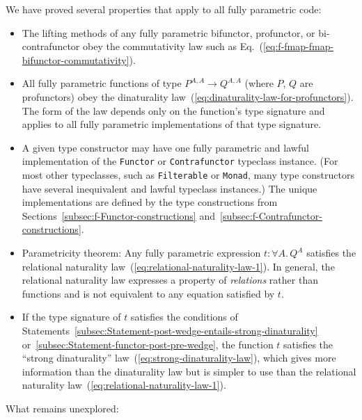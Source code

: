We have proved several properties that apply to all fully parametric
code:
\begin{itemize}
\item The lifting methods of any fully parametric bifunctor, profunctor,
or bi-contrafunctor obey the commutativity law such as Eq.~(\ref{eq:f-fmap-fmap-bifunctor-commutativity}). 
\item All fully parametric functions of type $P^{A,A}\rightarrow Q^{A,A}$
(where $P$, $Q$ are profunctors) obey the dinaturality law~(\ref{eq:dinaturality-law-for-profunctors}).
The form of the law depends only on the function\textsf{'}s type signature
and applies to all fully parametric implementations of that type signature. 
\item A given type constructor may have one fully parametric and lawful
implementation of the \lstinline!Functor! or \lstinline!Contrafunctor!
typeclass instance. (For most other typeclasses, such as \lstinline!Filterable!
or \lstinline!Monad!, many type constructors have several inequivalent
and lawful typeclass instances.) The unique implementations are defined
by the type constructions from Sections~\ref{subsec:f-Functor-constructions}
and~\ref{subsec:f-Contrafunctor-constructions}.
\item Parametricity theorem: Any fully parametric expression $t:\forall A.\,Q^{A}$
satisfies the relational naturality law~(\ref{eq:relational-naturality-law-1}).
In general, the relational naturality law expresses a property of
\emph{relations} rather than functions and is not equivalent to any
equation satisfied by $t$. 
\item If the type signature of $t$ satisfies the conditions of Statements~\ref{subsec:Statement-post-wedge-entails-strong-dinaturality}
or~\ref{subsec:Statement-functor-post-pre-wedge}, the function $t$
satisfies the \textsf{``}strong dinaturality\textsf{''} law~(\ref{eq:strong-dinaturality-law}),
which gives more information than the dinaturality law but is simpler
to use than the relational naturality law~(\ref{eq:relational-naturality-law-1}).
\end{itemize}
What remains unexplored:
